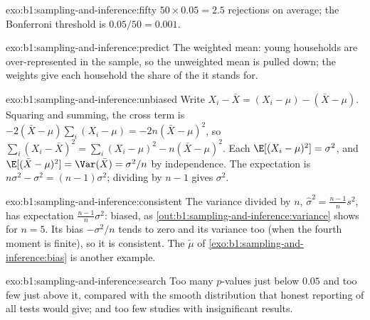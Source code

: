 \begin{solution}{exo:b1:sampling-and-inference:fifty}
$50 \times 0.05 = 2.5$ rejections on average; the Bonferroni threshold is $0.05/50 = 0.001$.
\end{solution}

\begin{solution}{exo:b1:sampling-and-inference:predict}
The weighted mean: young households are over-represented in the sample,
so the unweighted mean is pulled down; the weights give each household
the share of the  it stands for.
\end{solution}

\begin{solution}{exo:b1:sampling-and-inference:unbiased}
Write $X_i - \bar X = (X_i - \mu) - (\bar X - \mu)$. Squaring and summing, the cross term is
$-2(\bar X - \mu)\sum_i (X_i - \mu) = -2n(\bar X - \mu)^2$, so $\sum_i (X_i - \bar X)^2 = \sum_i (X_i - \mu)^2 - n(\bar X - \mu)^2$. Each
$\E[(X_i - \mu)^2] = \sigma^2$, and $\E[(\bar X - \mu)^2] = \Var(\bar X) = \sigma^2/n$ by independence. The expectation is
$n\sigma^2 - \sigma^2 = (n - 1)\sigma^2$; dividing by $n - 1$ gives $\sigma^2$.
\end{solution}

\begin{solution}{exo:b1:sampling-and-inference:consistent}
The variance divided by $n$, $\hat\sigma^2 = \frac{n-1}{n}s^2$, has expectation $\frac{n-1}{n}\sigma^2$: biased, as
\cref{out:b1:sampling-and-inference:variance} shows for $n = 5$. Its bias $-\sigma^2/n$ tends to zero and its
variance too (when the fourth moment is finite), so it is consistent. The 
$\tilde\mu$ of \cref{exo:b1:sampling-and-inference:bias} is another example.
\end{solution}

\begin{solution}{exo:b1:sampling-and-inference:search}
Too many $p$-values just below $0.05$ and too few just above it, compared with
the smooth distribution that honest reporting of all tests would give; and
too few studies with insignificant results.
\end{solution}

